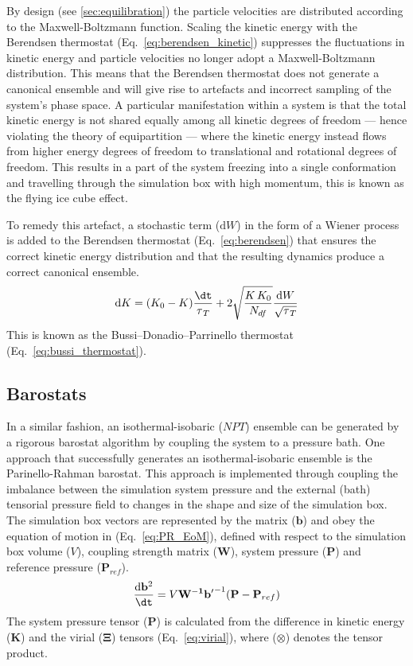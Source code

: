 By design (see \ref{sec:equilibration}) the particle velocities are distributed according to the Maxwell-Boltzmann function. Scaling the kinetic energy with the Berendsen thermostat (Eq.~\ref{eq:berendsen_kinetic}) suppresses the fluctuations in kinetic energy and particle velocities no longer adopt a Maxwell-Boltzmann distribution. This means that the Berendsen thermostat does not generate a canonical ensemble and will give rise to artefacts and incorrect sampling of the system's phase space. A particular manifestation within a system is that the total kinetic energy is not shared equally among all kinetic degrees of freedom --- hence violating the theory of equipartition --- where the kinetic energy instead flows from higher energy degrees of freedom to translational and rotational degrees of freedom. This results in a part of the system freezing into a single conformation and travelling through the simulation box with high momentum, this is known as the flying ice cube effect.\cite{harvey1998flying} 

To remedy this artefact, a stochastic term ($\mathrm{d}W$) in the form of a Wiener process is added to the Berendsen thermostat (Eq.~\ref{eq:berendsen}) that ensures the correct kinetic energy distribution and that the resulting dynamics produce a correct canonical ensemble.
%
\begin{equation} \label{eq:bussi_thermostat}
    \mathrm{d}K = (K_0 - K)\frac{\dt}{\tau_{\,T}} + 2 \sqrt{\frac{K\,K_0}{N_{df}}} \frac{\mathrm{d}W}{\sqrt{\tau_{\,T}}}
\end{equation}
This is known as the Bussi–Donadio–Parrinello thermostat (Eq.~\ref{eq:bussi_thermostat}).\cite{bussi2007canonical}
\subsection{Barostats}
In a similar fashion, an isothermal-isobaric ($NPT$) ensemble can be generated by a rigorous barostat algorithm by coupling the system to a pressure bath. One approach that successfully generates an isothermal-isobaric ensemble is the Parinello-Rahman barostat.\cite{parrinello1981polymorphic} This approach is implemented through coupling the imbalance between the simulation system pressure and the external (bath) tensorial pressure field to changes in the shape and size of the simulation box. The simulation box vectors are represented by the matrix ($\mathbf{b}$) and obey the equation of motion in (Eq.~\ref{eq:PR_EoM}), defined with respect to the simulation box volume ($V$), coupling strength matrix ($\mathbf{W}$), system pressure ($\mathbf{P}$) and reference pressure ($\mathbf{P}_{ref}$).
%
\begin{equation} \label{eq:PR_EoM}
    \frac{\mathrm{d}\mathbf{b}^2}{\dt} = V \mathbf{W^{-1}}\mathbf{b'}^{-1} (\mathbf{P}-\mathbf{P}_{ref})
\end{equation}
%
The system pressure tensor ($\mathbf{P}$) is calculated from the difference in kinetic energy ($\mathbf{K}$) and the virial ($\bm{\Xi}$) tensors (Eq.~\ref{eq:virial}), where ($\otimes$) denotes the tensor product. 

